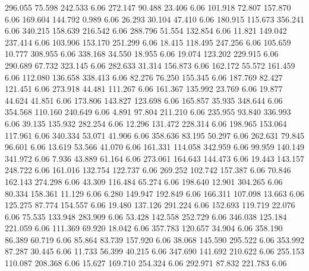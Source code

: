 296.055   75.598  242.533         6.06
 272.147   90.488   23.406         6.06
 101.918   72.807  157.870         6.06
 169.604  144.792    0.989         6.06
  26.293   30.104   47.410         6.06
 180.915  115.673  356.241         6.06
 340.215  158.639  216.542         6.06
 288.796   51.554  132.854         6.06
  11.821  149.042  237.414         6.06
 103.906  153.170  251.299         6.06
  18.415  118.495  247.256         6.06
 105.659   10.777  308.955         6.06
 338.168   34.550   18.955         6.06
  19.074  123.202  229.915         6.06
 290.689   67.732  323.145         6.06
 282.633   31.314  156.873         6.06
 162.172   55.572  161.459         6.06
 112.080  136.658  338.413         6.06
  82.276   76.250  155.345         6.06
 187.769   82.427  121.451         6.06
 273.918   44.481  111.267         6.06
 161.367  135.992   23.769         6.06
  19.877   44.624   41.851         6.06
 173.806  143.827  123.698         6.06
 165.857   35.935  348.644         6.06
 354.568  110.160  240.649         6.06
   4.891   97.804  211.210         6.06
 235.955   93.840  336.993         6.06
  39.135  135.932  282.254         6.06
  12.296  131.472  228.314         6.06
 198.965  153.064  117.961         6.06
 340.334   53.071   41.906         6.06
 358.636   83.195   50.297         6.06
 262.631   79.845   96.601         6.06
  13.619   53.566   41.070         6.06
 161.331  114.058  342.959         6.06
  99.959  140.149  341.972         6.06
   7.936   43.889   61.164         6.06
 273.061  164.643  144.473         6.06
  19.443  143.157  248.722         6.06
 161.016  132.754  122.737         6.06
 269.252  102.742  157.387         6.06
  70.846  162.143  274.298         6.06
  43.309  116.484   65.274         6.06
 198.640   12.901  304.265         6.06
  80.334  158.361   11.129         6.06
   6.280  149.947  192.849         6.06
 166.311  107.098   13.663         6.06
 125.275   87.774  154.557         6.06
  19.480  137.126  291.224         6.06
 152.693  119.719   22.076         6.06
  75.535  133.948  283.909         6.06
  53.428  142.558  252.729         6.06
 346.038  125.184  221.059         6.06
 111.369   69.920   18.042         6.06
 357.783  120.657   34.904         6.06
 358.190   86.389   60.719         6.06
  85.864   83.739  157.920         6.06
  38.068  145.590  295.522         6.06
 353.992   87.287   30.445         6.06
  11.733   56.399   40.215         6.06
 347.690  141.692  210.622         6.06
 255.153  110.087  208.368         6.06
  15.627  169.710  254.324         6.06
 292.971   87.832  221.783         6.06
